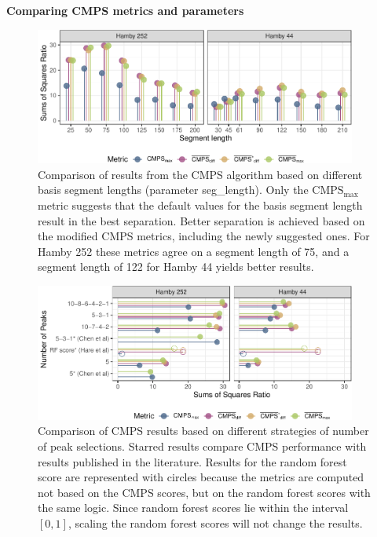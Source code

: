 \textbf{Comparing CMPS metrics and parameters}

\begin{figure}

{\centering \includegraphics[width=400px]{ju-hofmann_files/figure-latex/param-seg-plot-1} 

}

\caption{Comparison of results from the CMPS algorithm based on different basis segment lengths (parameter seg\_length). Only the $\mathrm{CMPS_{max}}$ metric suggests that the default values for the basis segment length result in the best separation. Better separation is achieved based on the modified CMPS metrics, including the newly suggested ones. For Hamby 252 these metrics agree on a segment length of 75, and a segment length of 122 for Hamby 44 yields better results. }\label{fig:param-seg-plot}
\end{figure}

\begin{figure}

{\centering \includegraphics[width=400px]{ju-hofmann_files/figure-latex/param-npeak-plot-1} 

}

\caption{Comparison of CMPS results based on different strategies of number of peak selections. Starred results compare CMPS performance with results published in the literature. Results for the random forest score are represented with circles because the metrics are computed not based on the CMPS scores, but on the random forest scores with the same logic. Since random forest scores lie within the interval $[0, 1]$, scaling the random forest scores will not change the results.}\label{fig:param-npeak-plot}
\end{figure}

